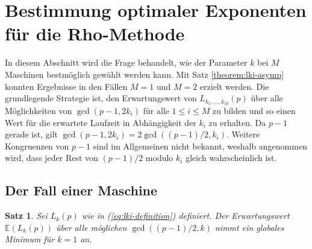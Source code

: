 \documentclass[a4paper, 11pt, ngerman]{article}
\newcommand{\E}{\mathbb{E}}
\theoremstyle{definition}
\theoremstyle{plain}
\newtheorem{theorem}{Satz}
\theoremstyle{remark}
\begin{document}
\section{Bestimmung optimaler Exponenten für die Rho-Methode}
\label{sec:optimal-k}

In diesem Abschnitt wird die Frage behandelt, wie der Parameter $k$ bei $M$ Maschinen bestmöglich gewählt werden kann. Mit Satz \ref{theorem:lki-asymp} konnten Ergebnisse in den Fällen $M = 1$ und $M = 2$ erzielt werden. Die grundlegende Strategie ist, den Erwartungswert von $L_{k_1, \dots, k_M}(p)$ über alle Möglichkeiten von $\gcd(p - 1, 2k_i)$ für alle $1 \le i \le M$ zu bilden und so einen Wert für die erwartete Laufzeit in Abhängigkeit der $k_i$ zu erhalten. Da $p - 1$ gerade ist, gilt $\gcd(p-1, 2k_i) = 2\gcd((p - 1)/2, k_i)$. Weitere Kongruenzen von $p - 1$ sind im Allgemeinen nicht bekannt, weshalb angenommen wird, dass jeder Rest von $(p- 1)/2$ modulo $k_i$ gleich wahrscheinlich ist.

\subsection{Der Fall einer Maschine}

\begin{theorem}
    \label{theorem:optimal-k-m1}
    Sei $L_k(p)$ wie in (\ref{eq:lki-definition}) definiert. Der Erwartungswert $\E(L_k(p))$ über alle möglichen $\gcd((p - 1)/2, k)$ nimmt ein globales Minimum für $k = 1$ an.
\end{theorem}
\end{document}
